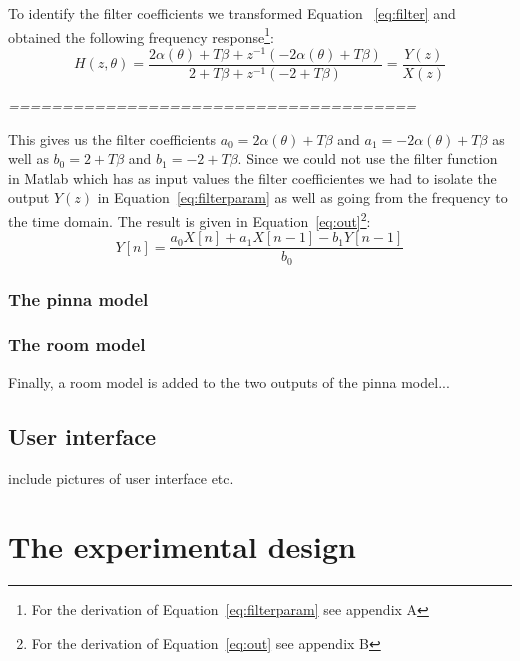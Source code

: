 \documentclass[journal]{IEEEtran}
\begin{document}
To identify the filter coefficients we transformed Equation ~\ref{eq:filter} and obtained the following frequency response\footnote{For the derivation of Equation~\ref{eq:filterparam} see appendix A}:
\begin{equation}\label{eq:filterparam}
H\left( z,\theta\right) = \frac{2\alpha (\theta)+T\beta+z^{-1}(-2\alpha(\theta)+T\beta)}{2+T\beta+z^{-1}(-2+T\beta)} = \frac{Y(z)}{X(z)}
\end{equation} 

\emph{======================================}

This gives us the filter coefficients $a_0 = 2\alpha (\theta)+T\beta$ and $a_1 = -2\alpha(\theta)+T\beta$ as well as $b_0 = 2+T\beta$ and $b_1 = -2+T\beta$. Since we could not use the filter function in Matlab which has as input values the filter coefficientes we had to isolate the output $Y(z)$ in Equation~\ref{eq:filterparam} as well as going from the frequency to the time domain. The result is given in Equation~\ref{eq:out}\footnote{For the derivation of Equation~\ref{eq:out} see appendix B}:
\begin{equation}\label{eq:out}
Y[n] =\frac{a_0X[n]+a_1X[n-1]-b_1Y[n-1]}{b_0}
\end{equation} 

\subsubsection{The pinna model}



\subsubsection{The room model}

Finally, a room model is added to the two outputs of the pinna model...





\subsection{User interface}
include pictures of user interface etc.

\section{The experimental design}
\end{document}
